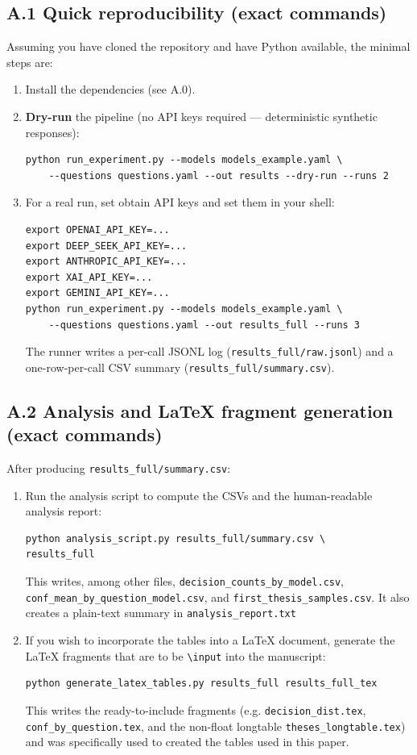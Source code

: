 \documentclass[12pt]{article}
\begin{document}
\subsection*{A.1 Quick reproducibility (exact commands)}
Assuming you have cloned the repository and have Python available, the minimal steps are:
\begin{enumerate}
  \item Install the dependencies (see A.0).
  \item \textbf{Dry-run} the pipeline (no API keys required — deterministic synthetic responses):
\begin{verbatim}
python run_experiment.py --models models_example.yaml \
    --questions questions.yaml --out results --dry-run --runs 2
\end{verbatim}
  \item For a real run, set obtain API keys and set them in your shell:
\begin{verbatim}
export OPENAI_API_KEY=...
export DEEP_SEEK_API_KEY=...
export ANTHROPIC_API_KEY=...
export XAI_API_KEY=...
export GEMINI_API_KEY=...
python run_experiment.py --models models_example.yaml \
    --questions questions.yaml --out results_full --runs 3
\end{verbatim}
  The runner writes a per-call JSONL log (\texttt{results\_full/raw.jsonl}) and a one-row-per-call CSV summary (\texttt{results\_full/summary.csv}).
\end{enumerate}

\subsection*{A.2 Analysis and LaTeX fragment generation (exact commands)}
After producing \texttt{results\_full/summary.csv}:
\begin{enumerate}
  \item Run the analysis script to compute the CSVs and the human-readable analysis report:
\begin{verbatim}
python analysis_script.py results_full/summary.csv \
results_full
\end{verbatim}
  This writes, among other files, \texttt{decision\_\-counts\_\-by\_\-model.csv}, \texttt{conf\_\-mean\_\-by\_\-question\_\-model.csv}, and \texttt{first\_\-thesis\_\-samples.csv}. It also creates a plain-text summary in \texttt{analysis\_\-report.txt}
  \item If you wish to incorporate the tables into a LaTeX document, generate the LaTeX fragments that are to be \texttt{\textbackslash input} into the manuscript:
\begin{verbatim}
python generate_latex_tables.py results_full results_full_tex
\end{verbatim}
  This writes the ready-to-include fragments (e.g. \texttt{decision\_\-dist.tex}, \texttt{conf\_\-by\_\-question.tex}, and the non-float longtable \texttt{theses\_\-longtable.tex}) and was specifically used to created the tables used in this paper.
\end{enumerate}
\end{document}
